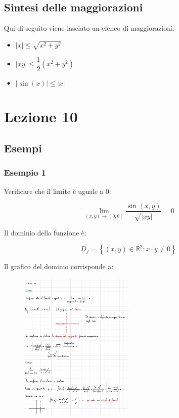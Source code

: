 \documentclass[a4paper]{article}
\begin{document}
	\newpage
	
	\subsection{Sintesi delle maggiorazioni}
	
	Qui di seguito viene lasciato un elenco di maggiorazioni:
	
	\begin{itemize}
		\item $|x| \le \sqrt{x^{2} + y^{2}}$
		\item $|xy| \le \dfrac{1}{2}\left(x^{2} + y^{2}\right)$
		\item $|\sin \left(x\right)| \le |x|$
	\end{itemize}

	\newpage
	
	\section{Lezione 10}
	
	\subsection{Esempi}
	
	\subsubsection[Esempio 1]{\textcolor{Green4}{Esempio 1}}
	
	Verificare che il limite è uguale a $0$:
	
	\begin{equation*}
		\lim_{\left(x,y\right) \rightarrow \left(0,0\right)} \dfrac{\sin\left(x,y\right)}{\sqrt{|xy|}} = 0
	\end{equation*}

	\noindent
	Il dominio della funzione è:
	
	\begin{equation*}
		D_{f} = \left\{\left(x,y\right) \in \mathbb{R}^{2} : x \cdot y \ne 0\right\}
	\end{equation*}

	\noindent
	Il grafico del dominio corrisponde a:
	
	\begin{figure}[!htp]
		\centering
		\includegraphics[width=0.5\textwidth]{img/limiti_ex3.pdf}
	\end{figure}
\end{document}

